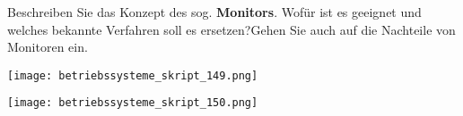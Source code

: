 \documentclass{article}
\begin{document}
\begin{tcolorbox}[colback=white!10!white,colframe=lightgray!75!black,
  savelowerto=\jobname_ex.tex,breakable,enhanced,lines before break=40]

\justifying
Beschreiben Sie das Konzept des sog. \textbf{Monitors}. Wofür ist es geeignet und welches bekannte Verfahren soll es ersetzen?Gehen Sie auch auf die Nachteile von Monitoren ein.

\tcblower

\justifying
\begin{center}
\texttt{[image: betriebssysteme\_skript\_149.png]}
\end{center}
\begin{center}
\texttt{[image: betriebssysteme\_skript\_150.png]}
\end{center}

\end{tcolorbox}
\end{document}
